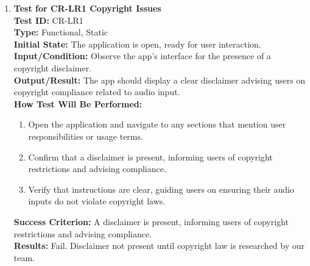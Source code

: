 \documentclass[12pt, titlepage]{article}
\begin{document}
\begin{enumerate}
    \item \textbf{Test for CR-LR1 Copyright Issues} \\
      \newline
      \textbf{Test ID:} CR-LR1 \\
      \textbf{Type:} Functional, Static \\
      \textbf{Initial State:} The application is open, ready for user interaction. \\
      \textbf{Input/Condition:} Observe the app’s interface for the presence of a copyright disclaimer. \\
      \textbf{Output/Result:} The app should display a clear disclaimer advising users on copyright compliance related to 
      audio input. \\
      \textbf{How Test Will Be Performed:}
      \begin{enumerate}
          \item Open the application and navigate to any sections that mention user responsibilities or usage terms.
          \item Confirm that a disclaimer is present, informing users of copyright restrictions and advising compliance.
          \item Verify that instructions are clear, guiding users on ensuring their audio inputs do not violate copyright laws.
      \end{enumerate}
      \textbf{Success Criterion:} A disclaimer is present, informing users of copyright restrictions and advising compliance.\\
      \textbf{Results:} Fail. Disclaimer not present until copyright law is researched by our team.\\


\end{enumerate}
\end{document}

